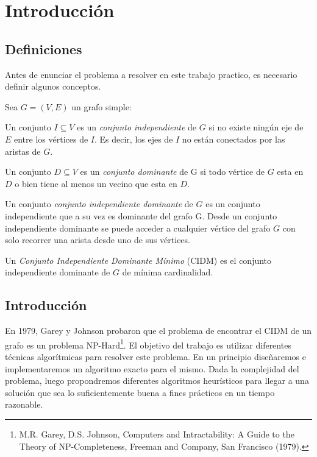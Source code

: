 \section{Introducción}

\subsection{Definiciones}

Antes de enunciar el problema a resolver en este trabajo practico, es necesario definir algunos conceptos.

Sea $G = (V,E)$ un grafo simple:
\begin{definition}
Un conjunto $I \subseteq V$ es un \textit{conjunto independiente} de $G$ si no existe ningún eje de $E$ entre los vértices de $I$. Es decir, los ejes de $I$ no están conectados por las aristas de $G$.
\end{definition}

\begin{definition}
Un conjunto $D \subseteq V$ es un \textit{conjunto dominante} de G si todo vértice de $G$ esta en $D$ o bien tiene al menos un vecino que esta en $D$.
\end{definition}

\begin{definition}
Un conjunto \textit{conjunto independiente dominante} de $G$ es un conjunto independiente que a su vez es dominante del grafo G. Desde un conjunto independiente dominante se puede acceder a cualquier vértice del grafo $G$ con solo recorrer una arista desde uno de sus vértices.
\end{definition}

\begin{definition}
Un \textit{Conjunto Independiente Dominante Mínimo} (CIDM) es el conjunto independiente dominante de $G$ de mínima cardinalidad.
\end{definition}

\subsection{Introducción}
En 1979, Garey y Johnson probaron que el problema de encontrar el CIDM de un grafo es un problema NP-Hard\footnote{M.R. Garey, D.S. Johnson, Computers and Intractability: A Guide to the Theory of NP-Completeness, Freeman and Company, San Francisco (1979).}.
El objetivo del trabajo es utilizar diferentes técnicas algorítmicas para resolver este problema. En un principio diseñaremos e implementaremos un algoritmo exacto para el mismo. Dada la complejidad del problema, luego propondremos diferentes algoritmos heurísticos para llegar a una solución que sea lo suficientemente buena a fines prácticos en un tiempo razonable.

